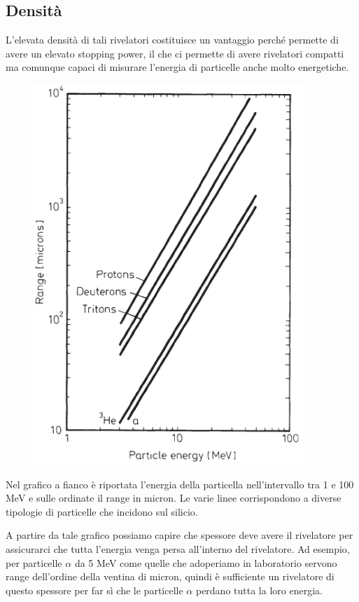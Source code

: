 \subsection{Densità}
L'elevata densità di tali rivelatori costituisce un vantaggio perché permette di avere un elevato stopping power, il che ci permette di avere rivelatori compatti ma comunque capaci di misurare l'energia di particelle anche molto energetiche.

\begin{esempio}
   \begin{minipage}{0.36\textwidth}
      \begin{figure}[H]
         \centering
         \includegraphics[width=0.91\textwidth]{immagini/range_particelle_in_semiconduttori.png}
      \end{figure}
   \end{minipage}
   \begin{minipage}{0.63\textwidth}
      Nel grafico a fianco è riportata l'energia della particella nell'intervallo tra 1 e 100 MeV e sulle ordinate il range in micron. Le varie linee corrispondono a diverse tipologie di particelle che incidono sul silicio.

      A partire da tale grafico possiamo capire che spessore deve avere il rivelatore per assicurarci che tutta l'energia venga persa all'interno del rivelatore. Ad esempio, per particelle $\alpha$ da 5 MeV come quelle che adoperiamo in laboratorio servono range dell'ordine della ventina di micron, quindi è sufficiente un rivelatore di questo spessore per far sì che le particelle $\alpha$ perdano tutta la loro energia.
   \end{minipage}
\end{esempio}

